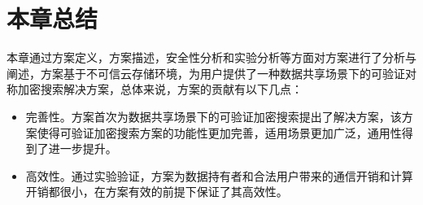 \section{本章总结}
本章通过方案定义，方案描述，安全性分析和实验分析等方面对\multi 方案进行了分析与阐述，\multi 方案基于不可信云存储环境，为用户提供了一种数据共享场景下的可验证对称加密搜索解决方案，总体来说，\multi 方案的贡献有以下几点：
\begin{itemize}
  \item 完善性。\multi 方案首次为数据共享场景下的可验证加密搜索提出了解决方案，该方案使得可验证加密搜索方案的功能性更加完善，适用场景更加广泛，通用性得到了进一步提升。
  \item 高效性。通过实验验证，\multi 方案为数据持有者和合法用户带来的通信开销和计算开销都很小，在方案有效的前提下保证了其高效性。
\end{itemize}
